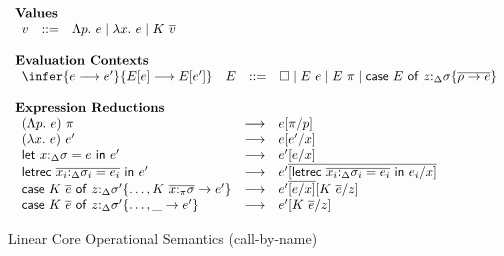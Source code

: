 
\begin{figure}[ht]
\begin{framed}
\small
\[
\begin{array}{l}
%
\textbf{Values} \\
\begin{array}{lcl}
    v & ::= & \Lambda p.~e \mid \lambda x.~e \mid K~\overline{v} \\
\end{array}\\\\
%
\textbf{Evaluation Contexts}\\
\begin{array}{llcl}
\infer{e \longrightarrow e'}{E[e] \longrightarrow E[e']} & E & ::= & \square \mid E~e \mid E~\pi \mid \ccase{E}{z{:}_{\Delta}\sigma \{\overline{\rho \to e}\}} \\
\end{array}\\\\
%
\textbf{Expression Reductions}\\
\begin{array}{lcl}
(\Lambda p.~e)~\pi & \longrightarrow & e[\pi/p]\\
%
(\lambda x.~e)~e' & \longrightarrow & e[e'/x]\\
%
\llet{x{:}_\Delta\sigma = e}{e'} & \longrightarrow & e'[e/x]\\
%
\lletrec{\overline{x_i{:}_\Delta\sigma_i = e_i}}{e'} & \longrightarrow &
    e'\overline{[\lletrec{\overline{x_i{:}_\Delta\sigma_i = e_i}}{e_i}/x]}\\
%
\ccase{K~\overline{e}}{z{:}_{\Delta}\sigma' \{\dots, K~\overline{x{:}_\pi\sigma} \to e'\}} &
\longrightarrow & e'\overline{[e/x]}[K~\overline{e}/z]\\
%
\ccase{K~\overline{e}}{z{:}_{\Delta}\sigma' \{\dots, \_ \to e'\}} & \longrightarrow & e'[K~\ov{e}/z]\\
\end{array}
\end{array}
\]
\end{framed}
\caption{Linear Core Operational Semantics \small(call-by-name)}
\label{linear-core-operational-semantics}
\end{figure}

